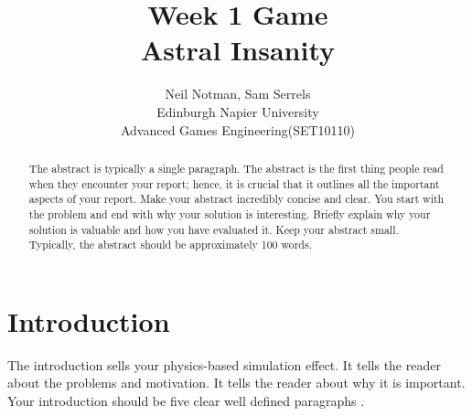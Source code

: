 \documentclass[conference,backref=page]{acmsiggraph}
\title{Week 1 Game\\
	   Astral Insanity}
\author{Neil Notman, Sam Serrels \\
Edinburgh Napier University\\
Advanced Games Engineering(SET10110)}
\begin{document}

\maketitle

\begin{abstract}

The abstract is typically a single paragraph.  The abstract is the first thing people read when they encounter your report; hence, it is crucial that it outlines all the important aspects of your report.  Make your abstract incredibly concise and clear.  You start with the problem and end with why your solution is interesting.  Briefly explain why your solution is valuable and how you have evaluated it.  Keep your abstract small.  Typically, the abstract should be approximately 100 words.

\end{abstract}



\keywordlist





\section{Introduction}

The introduction sells your physics-based simulation effect.  It tells the reader about the problems and motivation.  It tells the reader about why it is important.  Your introduction should be five clear well defined paragraphs \cite{day2012write}.
\end{document}
